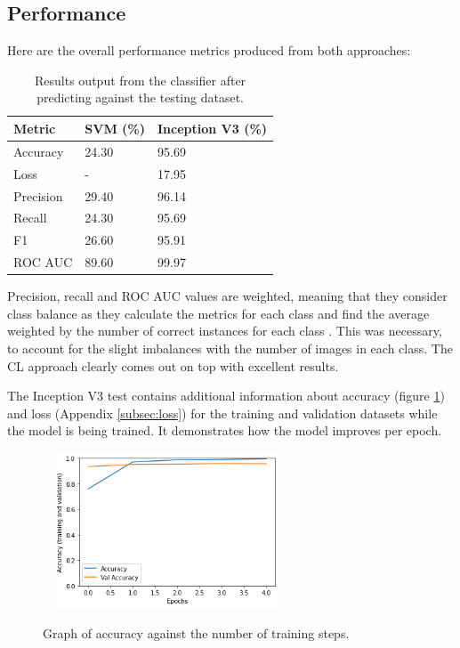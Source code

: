 \documentclass[12pt,a4paper]{report}
\begin{document}
\subsection{Performance}

Here are the overall performance metrics produced from both approaches:

\begin{table}[h!]
    \centering
    \begin{tabular}{ |l|l|l| }
        \hline
        Metric & SVM (\%) & Inception V3 (\%) \\
        \hline
        \hline
        Accuracy & 24.30 & 95.69 \\
        \hline
        Loss & - & 17.95 \\
        \hline
        Precision & 29.40 & 96.14 \\
        \hline
        Recall & 24.30 & 95.69 \\
        \hline
        F1 & 26.60 & 95.91 \\
        \hline
        ROC AUC & 89.60 & 99.97 \\
        \hline
    \end{tabular}
    \caption{Results output from the classifier after predicting against the testing dataset.}
    \label{table:2}
\end{table}

\break

Precision, recall and ROC AUC values are weighted, meaning that they consider class balance as they calculate the metrics
for each class and find the average weighted by the number of correct instances for each class 
\citep{scikitprec}. This was necessary, to account for the slight imbalances with the number of images 
in each class. The CL approach clearly comes out on top with excellent results.

\par

The Inception V3 test contains additional information about accuracy (figure \ref{fig:incep_acc}) and loss 
(Appendix \ref{subsec:loss}) for the training and validation datasets 
while the model is being trained. It demonstrates how the model improves per epoch.

\begin{figure}[h]\
    \centering
    \includegraphics[width=0.6\textwidth]{Accuracy.png}
    \caption{Graph of accuracy against the number of training steps.}
    \label{fig:incep_acc}
\end{figure}
\end{document}
